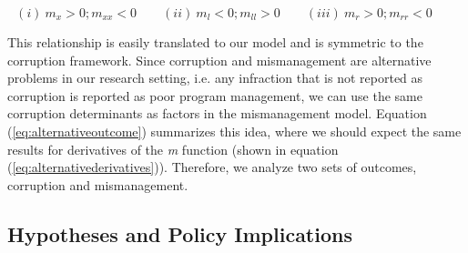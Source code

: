 \documentclass[11pt]{article}
\newcommand{\hypopen}{Comparing procurement calls}
\begin{document}
\begin{equation} \label{eq:alternativederivatives}
  (i) \   m_{x} > 0; m_{xx} < 0 \qquad
  (ii) \  m_{l} < 0; m_{ll} > 0 \qquad
  (iii) \ m_{r} > 0; m_{rr} < 0 \qquad
\end{equation}

This relationship is easily translated to our model and is symmetric to the corruption framework. Since corruption and mismanagement are alternative problems in our research setting, i.e. any infraction that is not reported as corruption is reported as poor program management, we can use the same corruption determinants as factors in the mismanagement model. Equation (\ref{eq:alternativeoutcome}) summarizes this idea, where we should expect the same results for derivatives of the \emph{m} function (shown in equation (\ref{eq:alternativederivatives})). Therefore, we analyze two sets of outcomes, corruption and mismanagement.

\subsection{Hypotheses and Policy Implications} \label{subsec:hypotheses}

\end{document}

